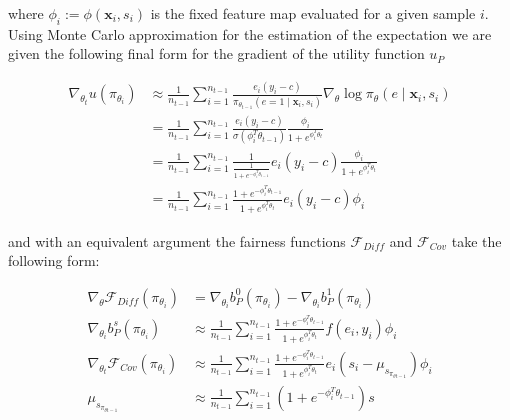 \documentclass[
	a4paper,
	11pt
	]{article}
\begin{document}
where $\phi_i := \phi(\boldsymbol{x}_i, s_i)$ is the fixed feature map evaluated for a given sample $i$. Using Monte Carlo approximation for the estimation of the expectation we are given the following final form for the gradient of the utility function $u_P$

\begin{align*}
    \nabla_{\theta_t}u(\pi_{\theta_i}) &\approx \frac{1}{n_{t-1}} \sum_{i=1}^{n_{t-1}} \frac{e_i(y_i - c)}{\pi_{\theta_{t-1}}(e = 1 \mid \boldsymbol{x}_i, s_i)}\nabla_{\theta} \log \pi_\theta(e \mid \boldsymbol{x}_i, s_i) \\
    &= \frac{1}{n_{t-1}} \sum_{i=1}^{n_{t-1}} \frac{e_i(y_i - c)}{\sigma(\phi_i^T\theta_{t-1})} \frac{\phi_i}{1 + e^{\phi_i^T\theta_t}} \\
    &= \frac{1}{n_{t-1}} \sum_{i=1}^{n_{t-1}} \frac{1}{\frac{1}{1 + e^{-\phi_i^T\theta_{t-1}}}} e_i(y_i - c) \frac{\phi_i}{1 + e^{\phi_i^T\theta_t}} \\
    &= \frac{1}{n_{t-1}} \sum_{i=1}^{n_{t-1}} \frac{1 + e^{-\phi_i^T\theta_{t-1}}}{1 + e^{\phi_i^T\theta_t}} e_i(y_i - c)\phi_i 
\end{align*}

and with an equivalent argument the fairness functions $\mathcal{F}_{Diff}$ and $\mathcal{F}_{Cov}$ take the following form:

\begin{align*}
    \nabla_{\theta}\mathcal{F}_{Diff}(\pi_{\theta_i}) &= \nabla_{\theta_i}b_P^0(\pi_{\theta_i}) - \nabla_{\theta_i}b_P^1(\pi_{\theta_i}) \\
    \nabla_{\theta_i}b_P^s(\pi_{\theta_i}) &\approx \frac{1}{n_{t-1}} \sum_{i=1}^{n_{t-1}} \frac{1 + e^{-\phi_i^T\theta_{t-1}}}{1 + e^{\phi_i^T\theta_t}} f(e_i, y_i)\phi_i \\
    \nabla_{\theta_t}\mathcal{F}_{Cov}(\pi_{\theta_i}) &\approx \frac{1}{n_{t-1}} \sum_{i=1}^{n_{t-1}} \frac{1 + e^{-\phi_i^T\theta_{t-1}}}{1 + e^{\phi_i^T\theta_t}} e_i(s_i - \mu_{s_{\pi_{\theta{t-1}}}})\phi_i \\
    \mu_{s_{\pi_{\theta{t-1}}}} &\approx  \frac{1}{n_{t-1}} \sum_{i=1}^{n_{t-1}} (1 + e^{-\phi_i^T\theta_{t-1}})s \\
\end{align*}


    
    

 

\end{document}
